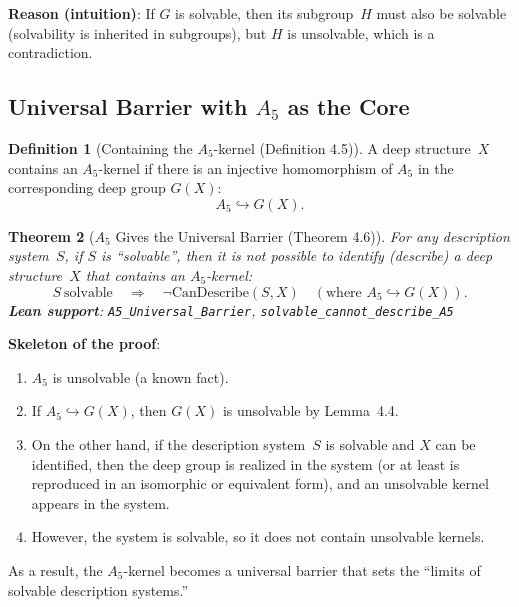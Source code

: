 \documentclass[11pt,a4paper]{article}
\theoremstyle{plain}
\newtheorem{theorem}{Theorem}[section]
\theoremstyle{definition}
\newtheorem{definition}[theorem]{Definition}
\newcommand{\Aalt}{A_5}
\newcommand{\lean}[1]{\texttt{#1}}
\begin{document}
\textbf{Reason (intuition)}: If $G$ is solvable, then its subgroup~$H$ must also be solvable (solvability is inherited in subgroups), but $H$ is unsolvable, which is a contradiction.

\subsection{Universal Barrier with $\Aalt$ as the Core}

\begin{definition}[Containing the $\Aalt$-kernel (Definition 4.5)]
A deep structure~$X$ contains an $\Aalt$-kernel if there is an injective homomorphism of $\Aalt$ in the corresponding deep group $G(X)$:
\[
\Aalt \hookrightarrow G(X).
\]
\end{definition}

\begin{theorem}[$\Aalt$ Gives the Universal Barrier (Theorem 4.6)]\label{thm:barrier}
For any description system~$S$, if $S$ is ``solvable'', then it is not possible to identify (describe) a deep structure~$X$ that contains an $\Aalt$-kernel:
\[
S\ \text{solvable} \quad \Longrightarrow \quad \neg\mathrm{CanDescribe}(S,X) \quad (\text{where } \Aalt \hookrightarrow G(X)).
\]
\textbf{Lean support}: \lean{A5\_Universal\_Barrier}, \lean{solvable\_cannot\_describe\_A5}
\end{theorem}

\textbf{Skeleton of the proof}:
\begin{enumerate}[nosep]
\item $\Aalt$ is unsolvable (a known fact).
\item If $\Aalt \hookrightarrow G(X)$, then $G(X)$ is unsolvable by Lemma~4.4.
\item On the other hand, if the description system~$S$ is solvable and $X$ can be identified, then the deep group is realized in the system (or at least is reproduced in an isomorphic or equivalent form), and an unsolvable kernel appears in the system.
\item However, the system is solvable, so it does not contain unsolvable kernels.
\end{enumerate}
As a result, the $\Aalt$-kernel becomes a universal barrier that sets the ``limits of solvable description systems.''
\end{document}
